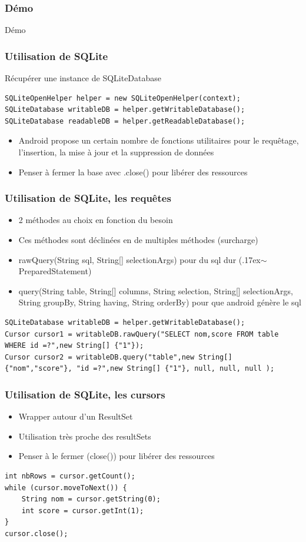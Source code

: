 \documentclass{beamer}
\begin{document}
\begin{frame}[fragile]
\frametitle{Démo}
Démo
\end{frame}
\begin{frame}[fragile]
\frametitle{Utilisation de SQLite}
Récupérer une instance de SQLiteDatabase
\begin{lstlisting}
SQLiteOpenHelper helper = new SQLiteOpenHelper(context);
SQLiteDatabase writableDB = helper.getWritableDatabase();
SQLiteDatabase readableDB = helper.getReadableDatabase();
\end{lstlisting}
\begin{itemize}
    \item Android propose un certain nombre de fonctions utilitaires pour le
    requêtage, l'insertion, la mise à jour et la suppression de données
    \item Penser à fermer la base avec .close() pour libérer des ressources
\end{itemize}
\end{frame}
\begin{frame}[fragile]
\frametitle{Utilisation de SQLite, les requêtes}
\begin{itemize}
    \item 2 méthodes au choix en fonction du besoin
    \item Ces méthodes sont déclinées en de multiples méthodes (surcharge)
    \item rawQuery(String sql, String[] selectionArgs) pour du sql dur ({\raise.17ex\hbox{$\scriptstyle\sim$}} PreparedStatement)
    \item query(String table, String[] columns, String selection, String[] selectionArgs, String groupBy, String having, String orderBy) pour que android génère le sql
\end{itemize}
\begin{lstlisting}
SQLiteDatabase writableDB = helper.getWritableDatabase();
Cursor cursor1 = writableDB.rawQuery("SELECT nom,score FROM table WHERE id =?",new String[] {"1"}); 
Cursor cursor2 = writableDB.query("table",new String[] {"nom","score"}, "id =?",new String[] {"1"}, null, null, null );
\end{lstlisting}
\end{frame}
\begin{frame}[fragile]
\frametitle{Utilisation de SQLite, les cursors}
\begin{itemize}
    \item Wrapper autour d'un ResultSet
    \item Utilisation très proche des resultSets
    \item Penser à le fermer (close()) pour libérer des ressources
\end{itemize}
\begin{lstlisting}
int nbRows = cursor.getCount();
while (cursor.moveToNext()) {
    String nom = cursor.getString(0);
    int score = cursor.getInt(1);
}
cursor.close();
\end{lstlisting}
\end{frame}
\end{document}
